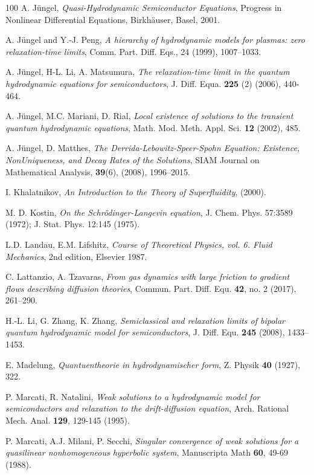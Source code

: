 \documentclass[leqno]{amsart}
\theoremstyle{plain}
\theoremstyle{definition}
\theoremstyle{remark}
\theoremstyle{plain}
\theoremstyle{plain}
\numberwithin{equation}{section}
\begin{document}
\begin{thebibliography}{100}
 A. J\"ungel, \emph{Quasi-Hydrodynamic Semiconductor Equations}, Progress in Nonlinear Differential Equations, Birkh\"auser, Basel, 2001.

 A. J\"ungel and Y.-J. Peng, \emph{A hierarchy of hydrodynamic models for plasmas: zero relaxation-time limits}, Comm. Part. Diff. Eqs., 24 (1999), 1007–1033.

 A. J\"{u}ngel, H-L. Li, A. Matsumura, \emph{The relaxation-time limit in the quantum hydrodynamic equations for semiconductors}, J. Diff. Equa. {\bf 225} (2) (2006), 440-464.

 A. J\"ungel, M.C. Mariani, D. Rial, \emph{Local existence of solutions to the transient quantum hydrodynamic equations}, Math. Mod. Meth. Appl. Sci. {\bf 12} (2002), 485.


 A. J\"{u}ngel, D. Matthes, \emph{The Derrida-Lebowitz-Speer-Spohn Equation: Existence, NonUniqueness, and Decay Rates of the Solutions}, SIAM Journal on Mathematical Analysis, {\bf 39}(6), (2008), 1996--2015.



 I. Khalatnikov, \emph{An Introduction to the Theory of Superfluidity}, (2000).

 M. D. Kostin, \emph{On the Schr\"odinger-Langevin equation}, J. Chem. Phys. 57:3589 (1972); J. Stat. Phys. 12:145 (1975).

 L.D. Landau, E.M. Lifshitz, \emph{Course of Theoretical Physics, vol. 6. Fluid Mechanics}, 2nd edition, Elsevier 1987.

 C. Lattanzio, A. Tzavaras, \emph{From gas dynamics with large friction to gradient flows describing diffusion theories}, Commun. Part. Diff. Equ. {\bf 42}, no. 2 (2017), 261--290.

 H.-L. Li, G. Zhang, K. Zhang, \emph{Semiclassical and relaxation limits of bipolar quantum hydrodynamic model for semiconductors}, J. Diff. Equ. {\bf 245} (2008), 1433–1453.

 E. Madelung, \textit{Quantuentheorie in hydrodynamischer form}, Z. Physik {\bf 40} (1927), 322.

 P. Marcati, R. Natalini, \emph{Weak solutions to a hydrodynamic model for semiconductors and relaxation to the drift-diffusion equation}, Arch. Rational Mech. Anal. {\bf 129}, 129-145 (1995).

 P. Marcati, A.J. Milani, P. Secchi, \emph{Singular convergence of weak solutions for a quasilinear nonhomogeneous hyperbolic system}, Manuscripta Math {\bf 60}, 49-69 (1988).


\end{thebibliography}
\end{document}
